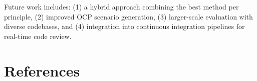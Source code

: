 \documentclass[12pt,a4paper,oneside]{report}
\begin{document}
Future work includes: (1) a hybrid approach combining the best method per principle, (2) improved OCP scenario generation, (3) larger-scale evaluation with diverse codebases, and (4) integration into continuous integration pipelines for real-time code review.

\chapter*{References}
\label{references}

\printbibliography[heading=none]
\end{document}
